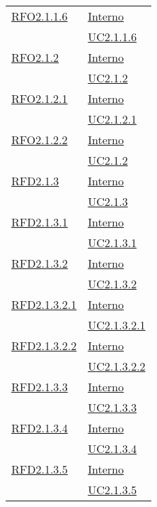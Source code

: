 \begin{longtable}{|>{\centering}m{5cm}|m{5cm}<{\centering}|}
\hyperlink{RFO2.1.1.6}{RFO2.1.1.6} & \hyperlink{Interno}{Interno}\\
& \hyperref[UC2.1.1.6]{UC2.1.1.6}\\ \hline

\hyperlink{RFO2.1.2}{RFO2.1.2} & \hyperlink{Interno}{Interno}\\
& \hyperref[UC2.1.2]{UC2.1.2}\\ \hline

\hyperlink{RFO2.1.2.1}{RFO2.1.2.1} & \hyperlink{Interno}{Interno}\\
& \hyperref[UC2.1.2.1]{UC2.1.2.1}\\ \hline

\hyperlink{RFO2.1.2.2}{RFO2.1.2.2} & \hyperlink{Interno}{Interno}\\
& \hyperref[UC2.1.2]{UC2.1.2}\\ \hline

\hyperlink{RFD2.1.3}{RFD2.1.3} & \hyperlink{Interno}{Interno}\\
& \hyperref[UC2.1.3]{UC2.1.3}\\ \hline

\hyperlink{RFD2.1.3.1}{RFD2.1.3.1} & \hyperlink{Interno}{Interno}\\
& \hyperref[UC2.1.3.1]{UC2.1.3.1}\\ \hline

\hyperlink{RFD2.1.3.2}{RFD2.1.3.2} & \hyperlink{Interno}{Interno}\\
& \hyperref[UC2.1.3.2]{UC2.1.3.2}\\ \hline

\hyperlink{RFD2.1.3.2.1}{RFD2.1.3.2.1} & \hyperlink{Interno}{Interno}\\
& \hyperref[UC2.1.3.2.1]{UC2.1.3.2.1}\\ \hline

\hyperlink{RFD2.1.3.2.2}{RFD2.1.3.2.2} & \hyperlink{Interno}{Interno}\\
& \hyperref[UC2.1.3.2.2]{UC2.1.3.2.2}\\ \hline

\hyperlink{RFD2.1.3.3}{RFD2.1.3.3} & \hyperlink{Interno}{Interno}\\
& \hyperref[UC2.1.3.3]{UC2.1.3.3}\\ \hline

\hyperlink{RFD2.1.3.4}{RFD2.1.3.4} & \hyperlink{Interno}{Interno}\\
& \hyperref[UC2.1.3.4]{UC2.1.3.4}\\ \hline

\hyperlink{RFD2.1.3.5}{RFD2.1.3.5} & \hyperlink{Interno}{Interno}\\
& \hyperref[UC2.1.3.5]{UC2.1.3.5}\\ \hline


\end{longtable}

